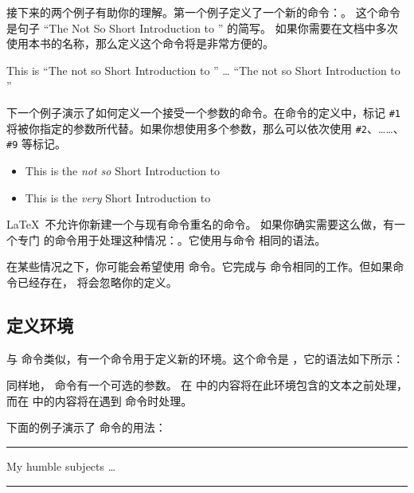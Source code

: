 接下来的两个例子有助你的理解。第一个例子定义了一个新的命令：。
这个命令是句子 ``The Not So Short Introduction to \LaTeXe'' 的简写。
如果你需要在文档中多次使用本书的名称，那么定义这个命令将是非常方便的。

\begin{example}
\newcommand{\tnss}{The not
    so Short Introduction to
    \LaTeXe}
This is ``\tnss'' \ldots{}
``\tnss''
\end{example}

下一个例子演示了如何定义一个接受一个参数的命令。在命令的定义中，标记 \verb|#1| 
将被你指定的参数所代替。如果你想使用多个参数，那么可以依次使用 \verb|#2|、……、
\verb|#9| 等标记。

\begin{example}
\newcommand{\txsit}[1]
 {This is the \emph{#1} Short
      Introduction to \LaTeXe}
\begin{itemize}
\item \txsit{not so}
\item \txsit{very}
\end{itemize}
\end{example}

\LaTeX\ 不允许你新建一个与现有命令重名的命令。 如果你确实需要这么做，有一个专门
的命令用于处理这种情况：。它使用与命令 
相同的语法。

在某些情况之下，你可能会希望使用  命令。它完成与  
命令相同的工作。但如果命令已经存在，\LaTeXe{} 将会忽略你的定义。

\subsection{定义环境}

与  命令类似，有一个命令用于定义新的环境。这个命令是 ，它的语法如下所示：

\begin{command}
\end{command}

同样地， 命令有一个可选的参数。
在  中的内容将在此环境包含的文本之前处理，而在  中的内容将在遇到  命令时处理。

下面的例子演示了  命令的用法：
\begin{example}
\newenvironment{king}
{\rule{1ex}{1ex}%
     \hspace{\stretch{1}}}
{%
     \rule{1ex}{1ex}}

\begin{king}
My humble subjects \ldots
\end{king}
\end{example}

